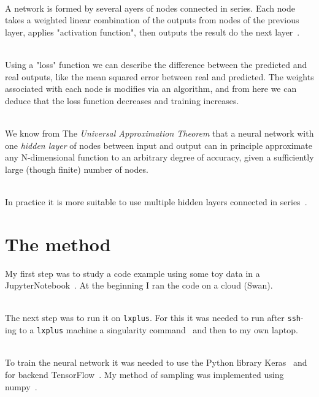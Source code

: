 \documentclass[a4paper,11pt,twoside]{article}
\begin{document}
\ \\A network is formed by several ayers of nodes connected in series. Each node takes a weighted linear combination of the outputs from nodes of the previous layer, applies "activation function", then outputs the result do the next layer~\cite{AndrewNg}.

\ \\Using a "loss" function we can describe the difference between the predicted and real outputs, like the mean squared error between real and predicted. The weights associated with each node is modifies via an algorithm, and from here we can deduce that the loss function decreases and training increases.

\ \\We know from The \emph{Universal Approximation Theorem} that a neural network with one \emph{hidden layer} of nodes between input and output can in principle approximate any N-dimensional function to an arbitrary degree of accuracy, given a sufficiently large (though finite) number of nodes. 

\ \\In practice it is more suitable to use multiple hidden layers connected in series~\cite{AndrewNg}.

\section{The method}

My first step was to study a code example using some toy data in a JupyterNotebook~\cite{glazov}. At the beginning I ran the code on a cloud (Swan). 

\ \\The next step was to run it on \texttt{lxplus}. For this it was needed to run after \texttt{ssh}-ing to a \texttt{lxplus} machine a singularity command~\cite{Singularity} and then to my own laptop.

\ \\To train the neural network it was needed to use the Python library Keras~\cite{keras} and for backend TensorFlow~\cite{tensorflow}. My method of sampling was implemented using numpy~\cite{numpy}.
\end{document}
